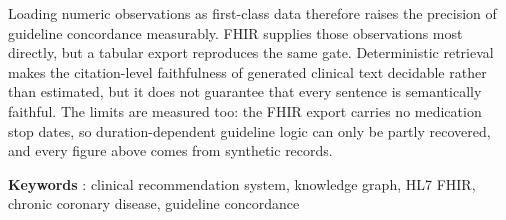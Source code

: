 \begin{singlespace}
{Loading numeric observations as first-class data therefore raises the precision of guideline
concordance measurably. FHIR supplies those observations most directly, but a tabular export
reproduces the same gate. Deterministic retrieval makes the citation-level faithfulness of
generated clinical text decidable rather than estimated, but it does not guarantee that every
sentence is semantically faithful.
The limits are measured too: the FHIR export carries no medication stop dates, so
duration-dependent guideline logic can only be partly recovered, and every figure above
comes from synthetic records.

}
\end{singlespace}

\vspace{6pt}
\noindent\textbf{Keywords} : clinical recommendation system, knowledge graph, HL7 FHIR,
chronic coronary disease, guideline concordance
